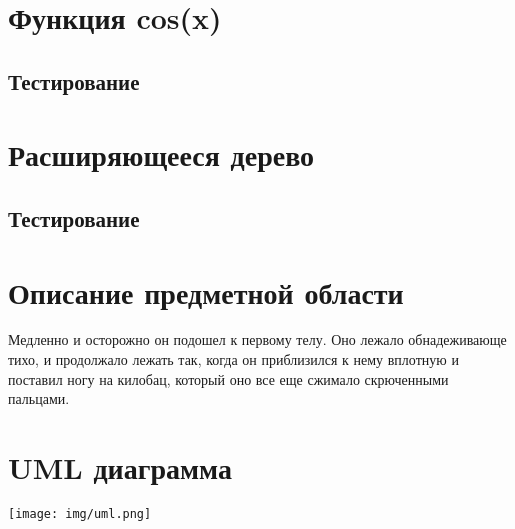 
\isonefalse
\def \labnum {1}
\def \labsubj {Тестирование программного обеспечения}
\def \labauthor {Айтуганов Д. А. \\ Чебыкин И. Б.}
\def \labgroup {P3301}
\isinspfalse
\def \labinsp {}
\def \labname {Вариант: 756}

\isnametrue
\lstset{
	caption=\lstname,
	captionpos=t,
	basicstyle=\ttfamily\selectfont\tiny
}
\usepackage{graphicx}


\section{Функция cos(x)}

\subsection{Тестирование}

\section{Расширяющееся дерево}

\subsection{Тестирование}

\section{Описание предметной области}
Медленно и осторожно он подошел к первому телу. Оно лежало обнадеживающе тихо,
и продолжало лежать так, когда он приблизился к нему вплотную и поставил ногу
на килобац, который оно все еще сжимало скрюченными пальцами.
\section{UML диаграмма}
\texttt{[image: img/uml.png]}



